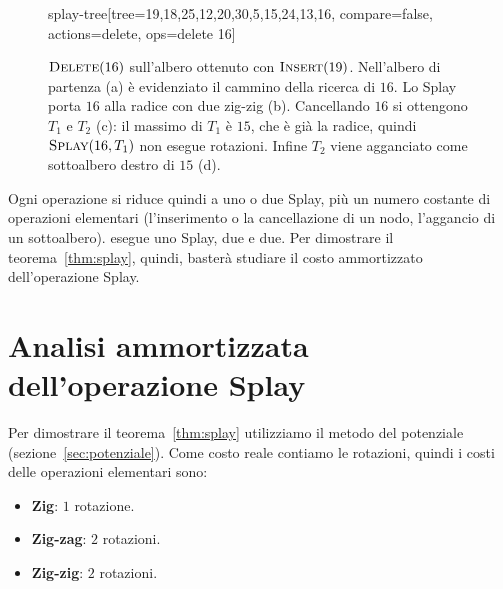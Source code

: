 \begin{figure}[htbp]
\begin{widget}{splay-tree}[tree={19,18,25,12,20,30,5,15,24,13,16}, compare=false, actions={delete}, ops={delete 16}]
\end{widget}
\caption{$\textsc{Delete}(16)$ sull'albero ottenuto con $\textsc{Insert}(19)$. Nell'albero di partenza (a) è evidenziato il cammino della ricerca di $16$. Lo Splay porta $16$ alla radice con due zig-zig (b). Cancellando $16$ si ottengono $T_1$ e $T_2$ (c): il massimo di $T_1$ è $15$, che è già la radice, quindi $\textsc{Splay}(16,T_1)$ non esegue rotazioni. Infine $T_2$ viene agganciato come sottoalbero destro di $15$ (d).}
\label{fig:delete-16}
\end{figure}

Ogni operazione si riduce quindi a uno o due Splay, più un numero costante di operazioni elementari (l'inserimento o la cancellazione di un nodo, l'aggancio di un sottoalbero). \Search{} esegue uno Splay, \Insert{} due e \Delete{} due. Per dimostrare il teorema~\ref{thm:splay}, quindi, basterà studiare il costo ammortizzato dell'operazione Splay.

\section{Analisi ammortizzata dell'operazione Splay}\label{sec:splay-analisi}
Per dimostrare il teorema~\ref{thm:splay} utilizziamo il metodo del potenziale (sezione~\ref{sec:potenziale}). Come costo reale contiamo le rotazioni, quindi i costi delle operazioni elementari sono:
\begin{itemize}
    \item \textbf{Zig}: $1$ rotazione.
    \item \textbf{Zig-zag}: $2$ rotazioni.
    \item \textbf{Zig-zig}: $2$ rotazioni.
\end{itemize}

